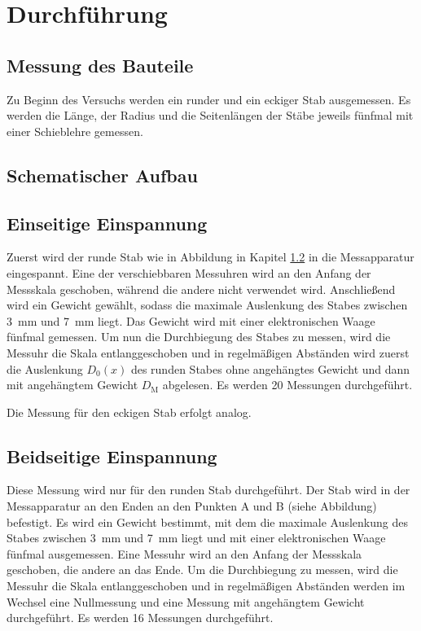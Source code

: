 \section{Durchführung} \label{sec:durchführung}

\subsection{Messung des Bauteile} \label{sec:bauteile}

    Zu Beginn des Versuchs werden ein runder und ein eckiger Stab ausgemessen.
    Es werden die Länge, der Radius und die Seitenlängen der Stäbe jeweils fünfmal mit
    einer Schieblehre gemessen.

\subsection{Schematischer Aufbau} \label{sec:aufbau} %

\subsection{Einseitige Einspannung}

    Zuerst wird der runde Stab wie in Abbildung in Kapitel \ref{sec:aufbau} in die Messapparatur eingespannt. %
    Eine der verschiebbaren Messuhren wird an den Anfang der Messskala geschoben, während die andere
    nicht verwendet wird.
    Anschließend wird ein Gewicht gewählt, sodass die maximale Auslenkung des Stabes zwischen \SI{3}{\milli\meter} und \SI{7}{\milli\meter} liegt.
    Das Gewicht wird mit einer elektronischen Waage fünfmal gemessen.
    Um nun die Durchbiegung des Stabes zu messen, wird die Messuhr die Skala entlanggeschoben und in 
    regelmäßigen Abständen wird zuerst die Auslenkung $D_0(x)$ des runden Stabes ohne angehängtes Gewicht 
    und dann mit angehängtem Gewicht $D_\text{M}$ abgelesen.
    Es werden 20 Messungen durchgeführt.

    Die Messung für den eckigen Stab erfolgt analog.

\subsection{Beidseitige Einspannung}

    Diese Messung wird nur für den runden Stab durchgeführt.
    Der Stab wird in der Messapparatur an den Enden an den Punkten A und B (siehe Abbildung) %
    befestigt.
    Es wird ein Gewicht bestimmt, mit dem die maximale Auslenkung des Stabes zwischen \SI{3}{\milli\meter} und \SI{7}{\milli\meter} liegt
    und mit einer elektronischen Waage fünfmal ausgemessen.
    Eine Messuhr wird an den Anfang der Messskala geschoben, die andere an das Ende.
    Um die Durchbiegung zu messen, wird die Messuhr die Skala entlanggeschoben und in regelmäßigen Abständen
    werden im Wechsel eine Nullmessung und eine Messung mit angehängtem Gewicht durchgeführt.
    Es werden 16 Messungen durchgeführt.
